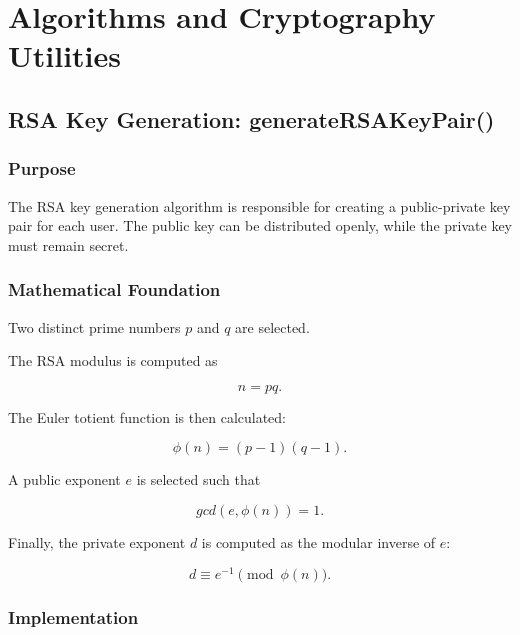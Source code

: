 \documentclass[12pt]{article}
\begin{document}
\section{Algorithms and Cryptography Utilities}

\subsection{RSA Key Generation: generateRSAKeyPair()}

\subsubsection{Purpose}

The RSA key generation algorithm is responsible for creating a public-private
key pair for each user. The public key can be distributed openly, while the
private key must remain secret.

\subsubsection{Mathematical Foundation}

Two distinct prime numbers $p$ and $q$ are selected.

The RSA modulus is computed as

\begin{equation}
n = pq.
\end{equation}

The Euler totient function is then calculated:

\begin{equation}
\phi(n) = (p-1)(q-1).
\end{equation}

A public exponent $e$ is selected such that

\begin{equation}
gcd(e,\phi(n)) = 1.
\end{equation}

Finally, the private exponent $d$ is computed as the modular inverse of $e$:

\begin{equation}
d \equiv e^{-1} \pmod{\phi(n)}.
\end{equation}

\subsubsection{Implementation}
\end{document}
